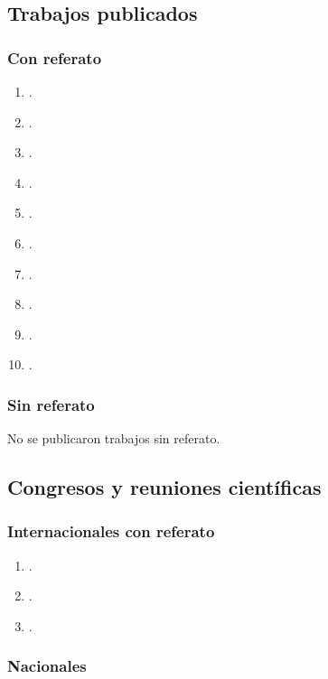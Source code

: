 \documentclass[a4paper,11pt,twoside,final,titlepage,onecolumn,openright]{report}
\begin{document}
\subsection{Trabajos publicados}

\subsubsection{Con referato}

\begin{enumerate}
    \item {}.
    \item {}.
    \item {}.
    \item {}.
    \item {}.
    \item {}.
    \item {}.
    \item {}.
    \item {}.
    \item {}.
\end{enumerate}

\subsubsection{Sin referato}
No se publicaron trabajos sin referato.

\subsection{Congresos y reuniones científicas} 

\subsubsection{Internacionales con referato}
\begin{enumerate}
    \item {}.
    \item {}.
    \item {}.
\end{enumerate}

\subsubsection{Nacionales}
\end{document}

